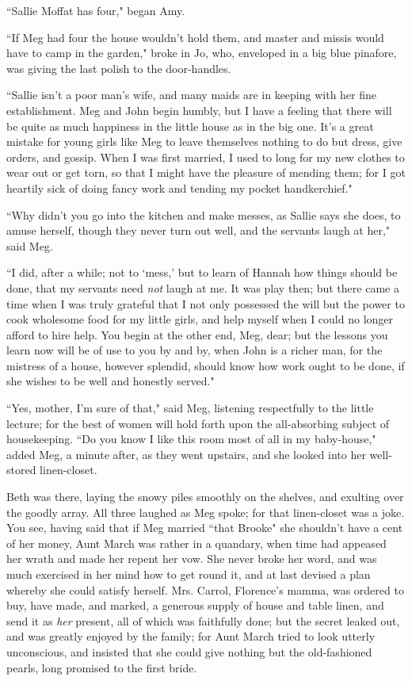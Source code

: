 ``Sallie Moffat has four," began Amy.

``If Meg had four the house wouldn't hold them, and
master and missis would have to camp in the garden," broke in Jo, who,
enveloped in a big blue pinafore, was giving the last polish to the
door-handles.

``Sallie isn't a poor man's wife, and
many maids are in keeping with her fine establishment. Meg and John
begin humbly, but I have a feeling that there will be quite as much
happiness in the little house as in the big one. It's a
great mistake for young girls like Meg to leave themselves nothing to do
but dress, give orders, and gossip. When I was first married, I used to
long for my new clothes to wear out or get torn, so that I might have
the pleasure of mending them; for I got heartily sick of doing fancy
work and tending my pocket handkerchief."

``Why didn't you go into the kitchen and make messes, as
Sallie says she does, to amuse herself, though they never turn out well,
and the servants laugh at her," said Meg.

``I did, after a while; not to `mess,'
but to learn of Hannah how things should be done, that my servants need
\emph{not} laugh at me. It was play then; but there came a time when I
was truly grateful that I not only possessed the will but the power to
cook wholesome food for my little girls, and help myself when I could no
longer afford to hire help. You begin at the other end, Meg, dear; but
the lessons you learn now will be of use to you by and by, when John is
a richer man, for the mistress of a house, however splendid, should know
how work ought to be done, if she wishes to be well and honestly
served."

``Yes, mother, I'm sure of that," said Meg, listening
respectfully to the little lecture; for the best of women will hold
forth upon the all-absorbing subject of housekeeping. ``Do you know I
like this room most of all in my baby-house," added Meg, a minute after,
as they went upstairs, and she looked into her well-stored linen-closet.

Beth was there, laying the snowy piles smoothly on the shelves, and
exulting over the goodly array. All three laughed as Meg spoke; for that
linen-closet was a joke. You see, having said that if Meg married ``that
Brooke" she shouldn't have a cent of her money, Aunt
March was rather in a quandary, when time had appeased her wrath and
made her repent her vow. She never broke her word, and was much
exercised in her mind how to get round it, and at last devised a plan
whereby she could satisfy herself. Mrs. Carrol,
Florence's mamma, was ordered to buy, have made, and
marked, a generous supply of house and table linen, and send it as
\emph{her} present, all of which was faithfully done; but the secret
leaked out, and was greatly enjoyed by the family; for Aunt March tried
to look utterly unconscious, and insisted that she could give nothing
but the old-fashioned pearls, long promised to the first bride.

